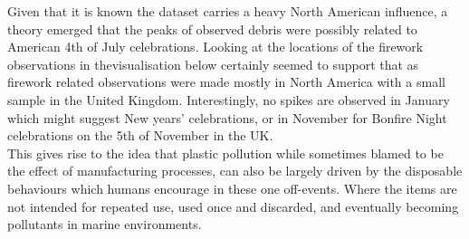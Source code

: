 \documentclass[10pt]{article}\usepackage[]{graphicx}\usepackage[]{color}
\begin{document}
Given that it is known the dataset carries a heavy North American influence, a theory emerged that the peaks of observed debris were possibly related to American 4th of July celebrations. Looking at the locations of the firework observations in thevisualisation below certainly seemed to support that as firework related observations were made mostly in North America with a small sample in the United Kingdom. Interestingly, no spikes are observed in January which might suggest New years' celebrations, or in November for Bonfire Night celebrations on the 5th of November in the UK.\\

This gives rise to the idea that plastic pollution while sometimes blamed to be the effect of manufacturing processes, can also be largely driven by the disposable behaviours which humans encourage in these one off-events. Where the items are not intended for repeated use, used once and discarded, and eventually becoming pollutants in marine environments.
\end{document}
